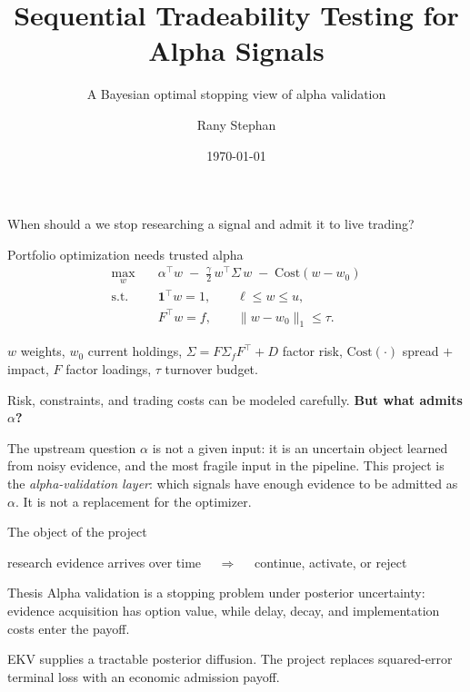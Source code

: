 \documentclass[aspectratio=169,10pt]{beamer}
\title{Sequential Tradeability Testing for Alpha Signals}
\subtitle{A Bayesian optimal stopping view of alpha validation}
\author{Rany Stephan}
\institute{MSE342 Project}
\date{\today}
\newcommand{\1}{\mathbf{1}}
\begin{document}
\begin{frame}
  \titlepage
  \vspace{-0.7em}
  \begin{center}
    \color{MSEGray}
    \large When should a we stop researching a signal and admit it to live trading?
  \end{center}
\end{frame}

\begin{frame}{Portfolio optimization needs trusted alpha}
  \large
  \[
  \begin{aligned}
    \max_{w}\quad &
      \alpha^\top w
      \;-\;\frac{\gamma}{2}\,w^\top\Sigma\,w
      \;-\;\mathrm{Cost}(w-w_0)\\[2pt]
    \text{s.t.}\quad
      & \mathbf 1^\top w = 1,
      \qquad \ell \le w \le u,\\[1pt]
      & F^\top w = f,
      \qquad \|w-w_0\|_1 \le \tau .
  \end{aligned}
  \]

  \vspace{0.2em}
  \footnotesize
  \(w\) weights, \(w_0\) current holdings, \(\Sigma=F\Sigma_f F^\top+D\) factor risk,
  \(\mathrm{Cost}(\cdot)\) spread \(+\) impact, \(F\) factor loadings, \(\tau\) turnover budget.
  \normalsize

  \vspace{0.5em}
  Risk, constraints, and trading costs can be modeled carefully.
  \textbf{But what admits \(\alpha\)?}

  \vspace{0.4em}
  \begin{block}{The upstream question}
    \(\alpha\) is not a given input: it is an uncertain object learned from noisy evidence,
    and the most fragile input in the pipeline. This project is the \emph{alpha-validation
    layer}: which signals have enough evidence to be admitted as \(\alpha\). It is not a
    replacement for the optimizer.
  \end{block}
\end{frame}

\begin{frame}{The object of the project}
  \begin{center}
  \large
  research evidence arrives over time
  \(\quad\Longrightarrow\quad\)
  continue, activate, or reject
  \end{center}

  \vspace{1.0em}

  \begin{block}{Thesis}
    Alpha validation is a stopping problem under posterior uncertainty: evidence
    acquisition has option value, while delay, decay, and implementation costs enter the
    payoff.
  \end{block}

  \vspace{0.8em}
  \normalsize
  EKV supplies a tractable posterior diffusion. The project replaces squared-error
  terminal loss with an economic admission payoff.
\end{frame}
\end{document}
